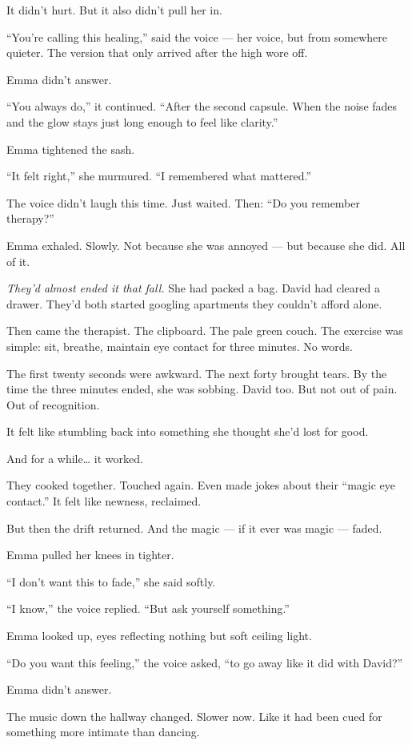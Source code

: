 It didn’t hurt.
But it also didn’t pull her in.

``You’re calling this healing,'' said the voice — her voice, but from somewhere quieter. The version 
that only arrived after the high wore off.

Emma didn’t answer.

``You always do,'' it continued. ``After the second capsule. When the noise fades and the glow stays 
just long enough to feel like clarity.''

Emma tightened the sash.

``It felt right,'' she murmured. ``I remembered what mattered.''

The voice didn’t laugh this time. Just waited. Then:
``Do you remember therapy?''

Emma exhaled. Slowly.
Not because she was annoyed — but because she did. All of it.

\textit{They’d almost ended it that fall.}
She had packed a bag.
David had cleared a drawer.
They’d both started googling apartments they couldn’t afford alone.

Then came the therapist. The clipboard. The pale green couch.
The exercise was simple: sit, breathe, maintain eye contact for three minutes. No words.

The first twenty seconds were awkward.
The next forty brought tears.
By the time the three minutes ended, she was sobbing. David too. But not out of pain.
Out of recognition.

It felt like stumbling back into something she thought she’d lost for good.

And for a while… it worked.

They cooked together. Touched again.
Even made jokes about their ``magic eye contact.''
It felt like newness, reclaimed.

But then the drift returned.
And the magic — if it ever was magic — faded.

Emma pulled her knees in tighter.

``I don’t want this to fade,'' she said softly.

``I know,'' the voice replied. ``But ask yourself something.''

Emma looked up, eyes reflecting nothing but soft ceiling light.

``Do you want this feeling,'' the voice asked, ``to go away like it did with David?''

Emma didn’t answer.

The music down the hallway changed. Slower now. Like it had been cued for something 
more intimate 
than dancing.

